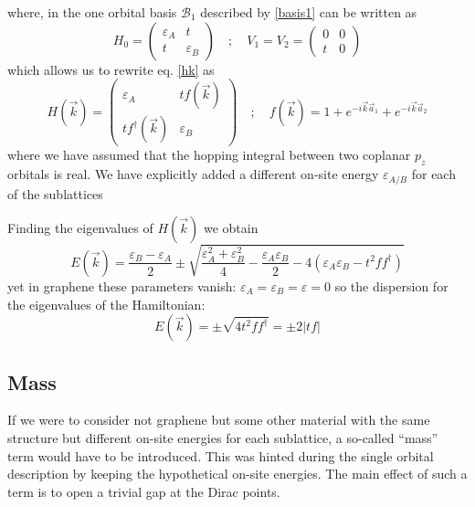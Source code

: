 where, in the one orbital basis $\mathcal{B}_1$ described by \eqref{basis1} can be written as
\begin{equation}
   H_0 = \left(\begin{array}{cc}
               \varepsilon_A & t \\
               t & \varepsilon_B
         \end{array}\right) \quad;\quad
   V_1 = V_2 = \left(\begin{array}{cc}
                     0 & 0 \\
                     t & 0
               \end{array}\right)
\end{equation}
which allows us to rewrite eq. \eqref{hk} as
\begin{equation}
  H(\vec{k})=\left(\begin{array}{cc}
        \varepsilon_{A} & tf(\vec{k}) \\
  tf^{\dagger}(\vec{k}) & \varepsilon_{B}
  \end{array}\right) \quad;\quad
  f(\vec{k}) = 1 + e^{-i\vec{k}\vec{a}_{1}}+
e^{-i\vec{k}\vec{a}_{2}}
\end{equation}
where we have assumed that the hopping integral between two coplanar $p_z$ orbitals is real. We have explicitly added a different on-site energy $\varepsilon_{A/B}$ for each of the sublattices

Finding the eigenvalues of $H(\vec{k})$ we obtain
\begin{equation}
  E(\vec{k})=\frac{\varepsilon_{B}-\varepsilon_{A}}{2}\pm
  \sqrt{\frac{\varepsilon^{2}_{A}+\varepsilon^{2}_{B}}{4}-
  \frac{\varepsilon_{A}\varepsilon_{B}}{2}-
  4\left(\varepsilon_{A}\varepsilon_{B}-t^2ff^{\dagger}\right) }
\end{equation}
yet in graphene these parameters vanish: $\varepsilon_{A}=\varepsilon_{B}=\varepsilon=0$ so the dispersion for the eigenvalues of the Hamiltonian:
\begin{equation}
  E(\vec{k})=\pm\sqrt{4t^2ff^{\dagger}} = \pm2|tf|
\end{equation}

%
%

\subsection{Mass}
If we were to consider not graphene but some other material with the same structure but different on-site energies for each sublattice, a so-called ``mass'' term would have to be introduced. This was hinted during the single orbital description by keeping the hypothetical on-site energies.
The main effect of such a term is to open a trivial gap at the Dirac points.

